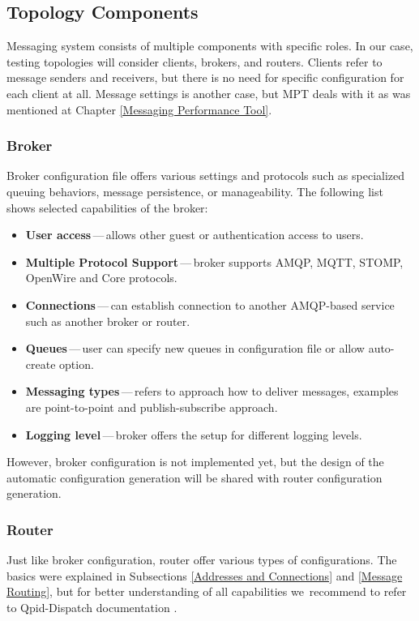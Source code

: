 \subsection{Topology Components}
Messaging system consists of multiple components with specific roles. In our case, testing topologies will consider clients, brokers, and routers. Clients refer to message senders and receivers, but there is no need for specific configuration for each client at all. Message settings is another case, but MPT deals with it as was mentioned at Chapter \ref{Messaging Performance Tool}.

\subsubsection*{Broker}
Broker configuration file offers various settings and protocols such as specialized queuing behaviors, message persistence, or manageability. The following list shows selected capabilities of the broker:

\begin{itemize}
	\setlength\itemsep{0em}
	\item \textbf{User access}\,---\,allows other guest or authentication access to users.
	\item \textbf{Multiple Protocol Support}\,---\,broker supports AMQP, MQTT, STOMP, OpenWire and Core protocols.
	\item \textbf{Connections}\,---\,can establish connection to another AMQP-based service such as another broker or router.
	\item \textbf{Queues}\,---\,user can specify new queues in configuration file or allow auto-create option.
	\item \textbf{Messaging types}\,---\,refers to approach how to deliver messages, examples are point-to-point and publish-subscribe approach.
	\item \textbf{Logging level}\,---\,broker offers the setup for different logging levels.
\end{itemize}
However, broker configuration is not implemented yet, but the design of the automatic configuration generation will be shared with router configuration generation.

\subsubsection*{Router}
Just like broker configuration, router offer various types of configurations. The basics were explained in Subsections \ref{Addresses and Connections} and \ref{Message Routing}, but for better understanding of all capabilities we~recommend to refer to Qpid-Dispatch documentation \cite{RH:Interconnect}.

